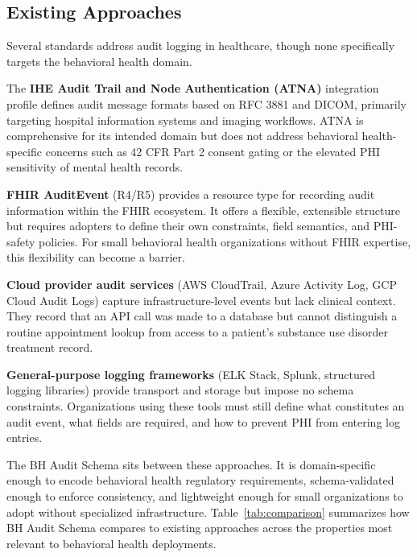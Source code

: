 \documentclass[11pt,a4paper]{article}
\begin{document}
\subsection{Existing Approaches}

Several standards address audit logging in healthcare, though none specifically targets the behavioral health domain.

The \textbf{IHE Audit Trail and Node Authentication (ATNA)} integration profile defines audit message formats based on RFC 3881 and DICOM, primarily targeting hospital information systems and imaging workflows. ATNA is comprehensive for its intended domain but does not address behavioral health-specific concerns such as 42 CFR Part 2 consent gating or the elevated PHI sensitivity of mental health records.

\textbf{FHIR AuditEvent} (R4/R5) provides a resource type for recording audit information within the FHIR ecosystem. It offers a flexible, extensible structure but requires adopters to define their own constraints, field semantics, and PHI-safety policies. For small behavioral health organizations without FHIR expertise, this flexibility can become a barrier.

\textbf{Cloud provider audit services} (AWS CloudTrail, Azure Activity Log, GCP Cloud Audit Logs) capture infrastructure-level events but lack clinical context. They record that an API call was made to a database but cannot distinguish a routine appointment lookup from access to a patient's substance use disorder treatment record.

\textbf{General-purpose logging frameworks} (ELK Stack, Splunk, structured logging libraries) provide transport and storage but impose no schema constraints. Organizations using these tools must still define what constitutes an audit event, what fields are required, and how to prevent PHI from entering log entries.

The BH Audit Schema sits between these approaches. It is domain-specific enough to encode behavioral health regulatory requirements, schema-validated enough to enforce consistency, and lightweight enough for small organizations to adopt without specialized infrastructure. Table~\ref{tab:comparison} summarizes how BH Audit Schema compares to existing approaches across the properties most relevant to behavioral health deployments.
\end{document}
